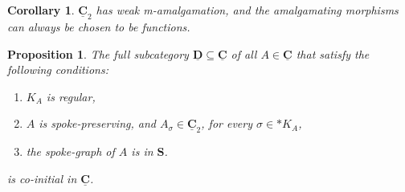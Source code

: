\documentclass[12pt]{amsart}
\numberwithin{equation}{section}
\theoremstyle{plain}
\newtheorem{corollary}[theorem]{\bf Corollary}
\newtheorem{proposition}[theorem]{\bf Proposition}
\theoremstyle{definition}
\newcommand \SSb{\mathbf{S}}
\newcommand \CCub{\underline{\mathbf{C}}}
\newcommand \DDub{\underline{\mathbf{D}}}
\begin{document}
\begin{corollary}
\label{co:C2MAmalgamation}
$\CCub_2$ has weak m-amalgamation, and the amalgamating morphisms can always be chosen to  be functions.
\end{corollary}


\begin{proposition}
	\label{pr:CatMCoInitial}
	The full subcategory $\DDub \subseteq \CCub$ of all $A \in \CCub$ that satisfy the following conditions:
	\begin{enumerate}
		\item $K_{A}$ is regular,
		\item $A$ is spoke-preserving, and $A_{\sigma} \in \CCub_2$, for every  $\sigma \in *K_A$,
		\item the spoke-graph of $A$ is in $\SSb$.
	\end{enumerate}
	is co-initial in $\CCub$.
\end{proposition}
\end{document}
